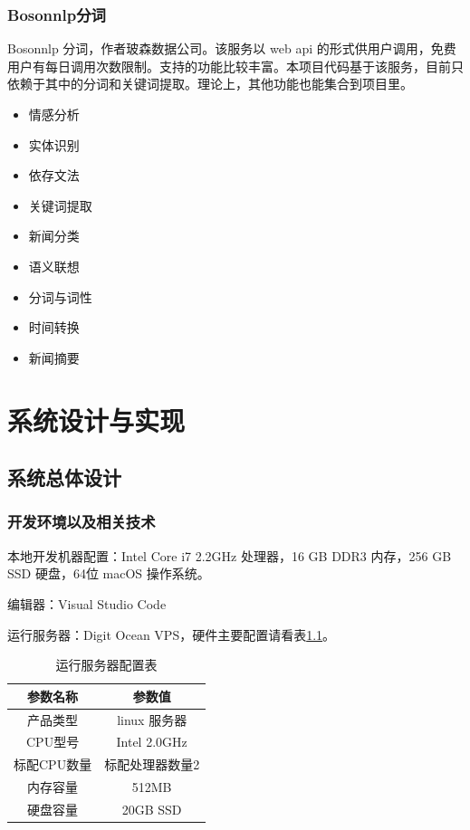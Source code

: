 \documentclass[bachelor,winfonts]{jnuthesis}
\begin{document}
\subsection{Bosonnlp分词}

Bosonnlp 分词\cite{bosonnlp-website}，作者玻森数据公司。该服务以 web api 的形式供用户调用，免费用户有每日调用次数限制。支持的功能比较丰富。本项目代码基于该服务，目前只依赖于其中的分词和关键词提取。理论上，其他功能也能集合到项目里。

\begin{itemize}
\item 情感分析
\item 实体识别
\item 依存文法
\item 关键词提取
\item 新闻分类
\item 语义联想
\item 分词与词性
\item 时间转换
\item 新闻摘要
\end{itemize}




\chapter{系统设计与实现}
\section{系统总体设计}

\subsection{开发环境以及相关技术}
本地开发机器配置：Intel Core i7 2.2GHz 处理器，16 GB DDR3 内存，256 GB SSD 硬盘，64位 macOS 操作系统。

编辑器：Visual Studio Code

运行服务器：Digit Ocean VPS，硬件主要配置请看表\ref{table:t2}。

\begin{table}[ht!]
  \centering
  \begin{tabular}{cc}
    \toprule
    \textbf{参数名称} & \textbf{参数值}\\
    \midrule
    产品类型  & linux 服务器 \\
    \hline
    CPU型号  & Intel 2.0GHz\\
    \hline
    标配CPU数量  & 标配处理器数量2\\
    \hline
    内存容量  & 512MB \\
    \hline
    硬盘容量  & 20GB SSD \\
    \bottomrule
  \end{tabular}
  \caption{运行服务器配置表}\label{table:t2}
\end{table}
\end{document}
